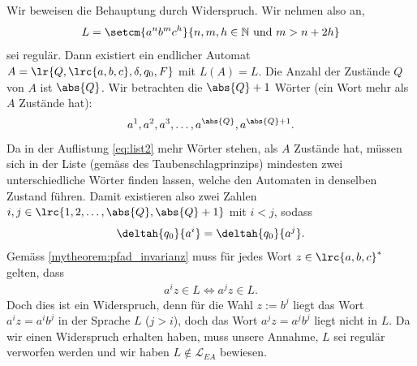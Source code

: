 \begin{myanswer}[myexercise:0406]
    Wir beweisen die Behauptung durch Widerspruch. Wir nehmen also an, 
    \[L = \setcm{a^n b^m c^h}{n,m,h\in\mathbb{N} \text{ und } m > n + 2h}\]
    sei regulär. Dann existiert ein endlicher Automat $A = \lr{Q,\lrc{a, b, c}, \delta, q_0, F}$ mit $L(A) = L$. Die Anzahl der Zustände $Q$ von $A$ ist $\abs{Q}$. Wir betrachten die $\abs{Q}+1$ Wörter (ein Wort mehr als $A$ Zustände hat):
	\begin{align}\label{eq:list2}
		a^1, a^2, a^3, \ldots , a^{\abs{Q}}, a^{\abs{Q}+1}.
	\end{align}
	Da in der Auflistung \ref{eq:list2} mehr Wörter stehen, als $A$ Zustände hat, müssen sich in der Liste (gemäss des Taubenschlagprinzips) mindesten zwei unterschiedliche Wörter finden lassen, welche den Automaten in denselben Zustand führen. Damit existieren also zwei Zahlen $i,j\in\lrc{1,2,\ldots ,\abs{Q}, \abs{Q}+1}$ mit $i<j$, sodass
	\begin{align*}
		\deltah{q_0}{a^i} = \deltah{q_0}{a^j}.
	\end{align*}
	Gemäss \cref{mytheorem:pfad_invarianz} muss für jedes Wort $z\in\lrc{a, b, c}^*$ gelten, dass
	\begin{align*}
		a^iz\in L \Longleftrightarrow a^jz\in L.
	\end{align*}
	Doch dies ist ein Widerspruch, denn für die Wahl $z := b^j$ liegt das Wort $a^iz = a^ib^j$ in der Sprache $L$ ($j>i$), doch das Wort $a^jz = a^jb^j$ liegt nicht in $L$. Da wir einen Widerspruch erhalten haben, muss unsere Annahme, $L$ sei regulär verworfen werden und wir haben $L\notin \mathcal{L}_{EA}$ bewiesen.
\end{myanswer}

